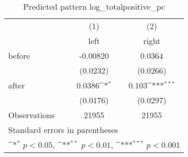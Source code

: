 \begin{table}[htbp]\centering
\def\sym#1{\ifmmode^{#1}\else\(^{#1}\)\fi}
\caption{Predicted pattern log\_totalpositive\_pc}
\begin{tabular}{l*{2}{c}}
\hline\hline
                    &\multicolumn{1}{c}{(1)}&\multicolumn{1}{c}{(2)}\\
                    &\multicolumn{1}{c}{left}&\multicolumn{1}{c}{right}\\
\hline
before              &    -0.00820         &      0.0364         \\
                    &    (0.0232)         &    (0.0266)         \\
[1em]
after               &      0.0386\sym{*}  &       0.103\sym{***}\\
                    &    (0.0176)         &    (0.0297)         \\
\hline
Observations        &       21955         &       21955         \\
\hline\hline
\multicolumn{3}{l}{\footnotesize Standard errors in parentheses}\\
\multicolumn{3}{l}{\footnotesize \sym{*} \(p<0.05\), \sym{**} \(p<0.01\), \sym{***} \(p<0.001\)}\\
\end{tabular}
\end{table}
